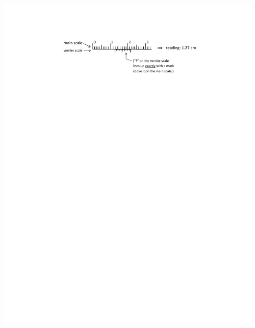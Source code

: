 \begin{center}
\vspace{0.1in}
\includegraphics{appendices/instrumentation/vernier_1p27_cm.pdf}
\end{center} 

\medskip

